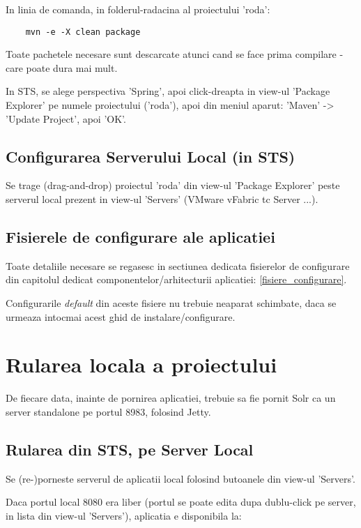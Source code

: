 In linia de comanda, in folderul-radacina al proiectului 'roda':
\begin{lstlisting}
	mvn -e -X clean package
\end{lstlisting}

Toate pachetele necesare sunt descarcate atunci cand se face prima compilare - care poate dura mai mult.

In STS, se alege perspectiva 'Spring', 
apoi click-dreapta in view-ul 'Package
Explorer' pe numele proiectului ('roda'), 
apoi din meniul aparut:
'Maven' -> 'Update Project', 
apoi 'OK'.


\subsection{Configurarea Serverului Local (in STS)}
Se trage (drag-and-drop) proiectul 'roda' din view-ul 'Package Explorer' 
peste serverul local prezent in view-ul 'Servers' (VMware vFabric tc Server ...).

\subsection{Fisierele de configurare ale aplicatiei}
Toate detaliile necesare se regasesc in sectiunea
dedicata fisierelor de configurare din capitolul dedicat componentelor/arhitecturii aplicatiei: 
\ref{fisiere_configurare}.

Configurarile \emph{default} din aceste fisiere nu trebuie neaparat
schimbate, daca se urmeaza intocmai acest ghid de instalare/configurare.

\section{Rularea locala a proiectului}

De fiecare data, inainte de pornirea aplicatiei, trebuie sa fie pornit Solr ca un server standalone pe portul 8983, folosind Jetty.

\subsection{Rularea din STS, pe Server Local}
Se (re-)porneste serverul de aplicatii local folosind butoanele din view-ul
'Servers'.

Daca portul local 8080 era liber (portul se poate edita dupa dublu-click pe
server, in lista din view-ul 'Servers'), aplicatia e disponibila la:

